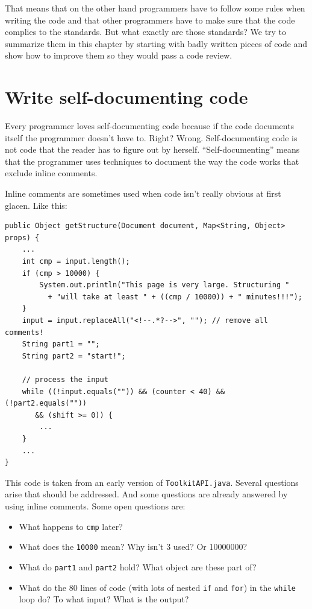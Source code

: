 \documentclass[12pt]{book}
\begin{document}
That means that on the other hand programmers have to follow some rules when writing the code and that other programmers have to make sure that the code complies to the standards. But what exactly are those standards? We try to summarize them in this chapter by starting with badly written pieces of code and show how to improve them so they would pass a code review.






\section{Write self-documenting code}

Every programmer loves self-documenting code because if the code documents itself the programmer doesn't have to. Right? Wrong. Self-documenting code is not code that the reader has to figure out by herself. ``Self-documenting'' means that the programmer uses techniques to document the way the code works that exclude inline comments. 

Inline comments are sometimes used when code isn't really obvious at first glacen. Like this:

\begin{lstlisting}[caption=selfdoc1.java] 
public Object getStructure(Document document, Map<String, Object> props) {
    ...
    int cmp = input.length();
    if (cmp > 10000) {
        System.out.println("This page is very large. Structuring " 
          + "will take at least " + ((cmp / 10000)) + " minutes!!!");
    }
    input = input.replaceAll("<!--.*?-->", ""); // remove all comments!
    String part1 = "";
    String part2 = "start!";

    // process the input
    while ((!input.equals("")) && (counter < 40) && (!part2.equals("")) 
       && (shift >= 0)) {
        ...
    }
    ...
}
\end{lstlisting}

This code is taken from an early version of {\tt ToolkitAPI.java}. Several questions arise that should be addressed. And some questions are already answered by using inline comments. Some open questions are:

\begin{itemize}
\item What happens to {\tt cmp} later?
\item What does the {\tt 10000} mean? Why isn't 3 used? Or 10000000? 
\item What do {\tt part1} and {\tt part2} hold? What object are these part of?
\item What do the 80 lines of code (with lots of nested {\tt if} and {\tt for}) in the {\tt while} loop do? To what input? What is the output?
\end{itemize} 
\end{document}
